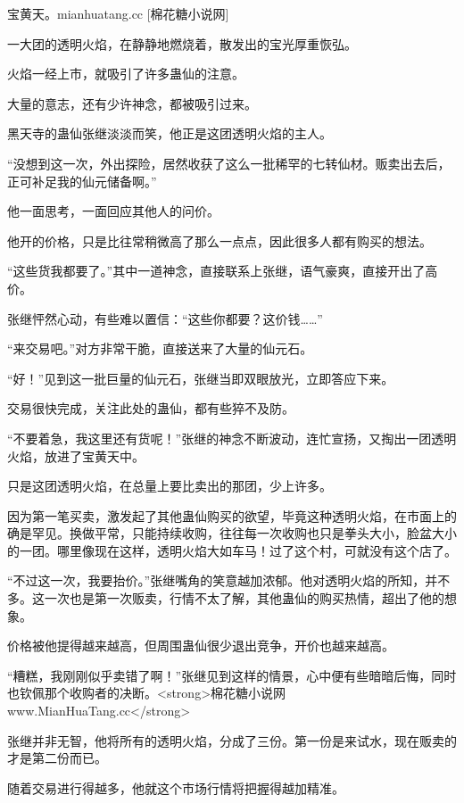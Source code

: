
\begin{this_body}

宝黄天。mianhuatang.cc [棉花糖小说网]

一大团的透明火焰，在静静地燃烧着，散发出的宝光厚重恢弘。

火焰一经上市，就吸引了许多蛊仙的注意。

大量的意志，还有少许神念，都被吸引过来。

黑天寺的蛊仙张继淡淡而笑，他正是这团透明火焰的主人。

“没想到这一次，外出探险，居然收获了这么一批稀罕的七转仙材。贩卖出去后，正可补足我的仙元储备啊。”

他一面思考，一面回应其他人的问价。

他开的价格，只是比往常稍微高了那么一点点，因此很多人都有购买的想法。

“这些货我都要了。”其中一道神念，直接联系上张继，语气豪爽，直接开出了高价。

张继怦然心动，有些难以置信：“这些你都要？这价钱……”

“来交易吧。”对方非常干脆，直接送来了大量的仙元石。

“好！”见到这一批巨量的仙元石，张继当即双眼放光，立即答应下来。

交易很快完成，关注此处的蛊仙，都有些猝不及防。

“不要着急，我这里还有货呢！”张继的神念不断波动，连忙宣扬，又掏出一团透明火焰，放进了宝黄天中。

只是这团透明火焰，在总量上要比卖出的那团，少上许多。

因为第一笔买卖，激发起了其他蛊仙购买的欲望，毕竟这种透明火焰，在市面上的确是罕见。换做平常，只能持续收购，往往每一次收购也只是拳头大小，脸盆大小的一团。哪里像现在这样，透明火焰大如车马！过了这个村，可就没有这个店了。

“不过这一次，我要抬价。”张继嘴角的笑意越加浓郁。他对透明火焰的所知，并不多。这一次也是第一次贩卖，行情不太了解，其他蛊仙的购买热情，超出了他的想象。

价格被他提得越来越高，但周围蛊仙很少退出竞争，开价也越来越高。

“糟糕，我刚刚似乎卖错了啊！”张继见到这样的情景，心中便有些暗暗后悔，同时也钦佩那个收购者的决断。<strong>棉花糖小说网www.MianHuaTang.cc</strong>

张继并非无智，他将所有的透明火焰，分成了三份。第一份是来试水，现在贩卖的才是第二份而已。

随着交易进行得越多，他就这个市场行情将把握得越加精准。


\end{this_body}
